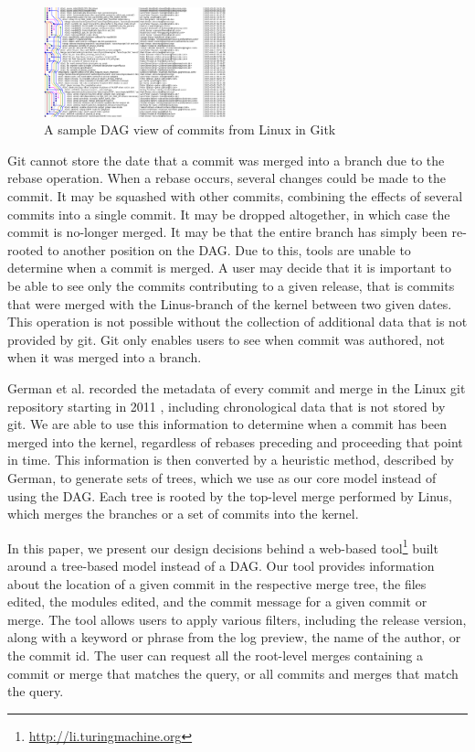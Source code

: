 \documentclass[conference, draftclsnofoot]{IEEEtran}
\begin{document}
\begin{figure}
        \centering
        \includegraphics[width=0.47\textwidth]{figures/gitk.png}
        \caption{A sample DAG view of commits from Linux in Gitk}
        \label{fig:gitk}
\end{figure}

Git cannot store the date that a commit was merged into a branch due to the rebase
operation.  When a rebase occurs, several changes could be made to the commit. It
may be squashed with other commits, combining the effects of several commits into a
single commit. It may be dropped altogether, in which case the commit is no-longer
merged.  It may be that the entire branch has simply been re-rooted to another
position on the DAG. Due to this, tools are unable to determine when a commit is
merged. A user may decide that it is important to be able to see only the commits
contributing to a given release, that is commits that were merged with the
Linus-branch of the kernel between two given dates. This operation is not possible
without the collection of additional data that is not provided by git. Git only
enables users to see when commit was authored, not when it was merged into a branch.

German et al. recorded the metadata of every commit and merge in the Linux git
repository starting in 2011 \cite{German2015}, including chronological data that is
not stored by git. We are able to use this information to determine when a commit
has been merged into the kernel, regardless of rebases preceding and proceeding that
point in time. This information is then converted by a heuristic method, described
by German, to generate sets of trees, which we use as our core model instead of
using the DAG. Each tree is rooted by the top-level merge performed by Linus, which
merges the branches or a set of commits into the kernel.

In this paper, we present our design decisions behind a web-based
tool\footnote{\url{http://li.turingmachine.org}} built around a tree-based model
instead of a DAG. Our tool provides information about the location of a given commit
in the respective merge tree, the files edited, the modules edited, and the commit
message for a given commit or merge. The tool allows users to apply various filters,
including the release version, along with a keyword or phrase from the log preview,
the name of the author, or the commit id. The user can request all the root-level
merges containing a commit or merge that matches the query, or all commits and
merges that match the query.
\end{document}

